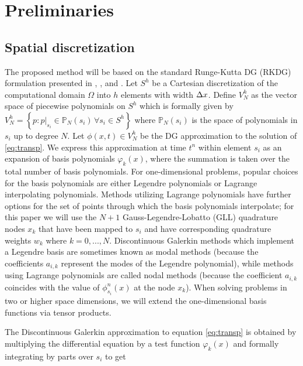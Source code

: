 \documentclass{ametsoc}
\begin{document}
\section{Preliminaries} \label{sec:dg}
\subsection*{Spatial discretization}
The proposed method will be based on the standard Runge-Kutta DG (RKDG) formulation presented in \citet{Hesthaven:2007aa}, \citet{durran2010numerical}, and \citet{Lauritzen:2011aa}. Let $S^h$ be a Cartesian discretization of the computational domain $\Omega$ into $h$ elements with width $\Delta x$. Define $V_N^h$ as the vector space of piecewise polynomials on $S^h$ which is formally given by $V_N^h = \left\{ p : p\big|_{s_i} \in \mathbb{P}_N(s_i) \, \forall s_i \in S^h \right\}$ where $\mathbb{P}_N(s_i)$ is the space of polynomials in $s_i$ up to degree $N$. Let $\phi(x,t) \in V_N^h$ be the DG approximation to the solution of \eqref{eq:transp}. We express this approximation at time $t^n$ within element $s_i$ as an expansion of basis polynomials $\varphi_k(x)$,
where the summation is taken over the total number of basis polynomials. For one-dimensional problems, popular choices for the basis polynomials are either Legendre polynomials or Lagrange interpolating polynomials. Methods utilizing Lagrange polynomials  have further options for the set of points through which the basis polynomials interpolate; for this paper we will use the $N+1$ Gauss-Legendre-Lobatto (GLL) quadrature nodes $x_k$ that have been mapped to $s_i$ and have corresponding quadrature weights $w_k$ where $k=0,...,N$. Discontinuous Galerkin methods which implement a Legendre basis are sometimes known as modal methods (because the coefficients $a_{i,k}$ represent the modes of the Legendre polynomial), while methods using Lagrange polynomials are called nodal methods (because the coefficient $a_{i,k}$ coincides with the value of $\phi_{s_i}^n(x)$ at the node $x_k$). When solving problems in two or higher space dimensions, we will extend the one-dimensional basis functions via tensor products.

The Discontinuous Galerkin approximation to equation \eqref{eq:transp} is obtained by multiplying the differential equation by a test function $\varphi_k(x)$ and formally integrating by parts over $s_i$ to get
\end{document}
